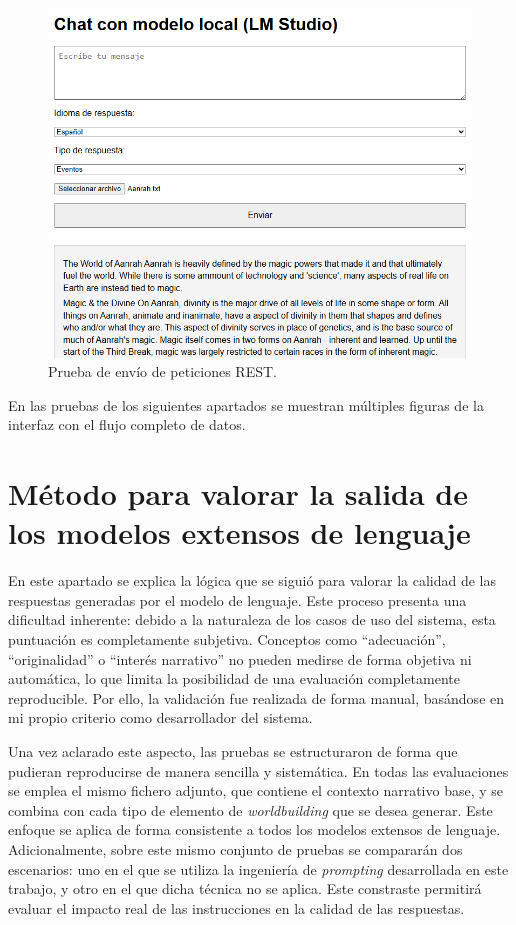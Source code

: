 \begin{figure}[htbp]
	\centering
	\includegraphics[width=1\textwidth]{./Figures/web-test.png}
	\caption{Prueba de envío de peticiones REST.}
	\label{fig:web-test}
\end{figure}

En las pruebas de los siguientes apartados se muestran múltiples figuras de la interfaz con el flujo completo de datos.

\section{Método para valorar la salida de los modelos extensos de lenguaje}
En este apartado se explica la lógica que se siguió para valorar la calidad de las respuestas
generadas por el modelo de lenguaje.
Este proceso presenta una dificultad inherente:
debido a la naturaleza de los casos de uso del sistema, esta puntuación es completamente subjetiva.
Conceptos como “adecuación”, “originalidad” o “interés narrativo” no pueden medirse de forma objetiva ni automática,
lo que limita la posibilidad de una evaluación completamente reproducible.
Por ello, la validación fue realizada de forma manual, basándose en mi propio criterio como desarrollador del sistema.

Una vez aclarado este aspecto, las pruebas se estructuraron de forma que pudieran reproducirse de manera sencilla y sistemática.
En todas las evaluaciones se emplea el mismo fichero adjunto, que contiene el contexto narrativo base,
y se combina con cada tipo de elemento de \textit{worldbuilding} que se desea generar.
Este enfoque se aplica de forma consistente a todos los modelos extensos de lenguaje.
Adicionalmente, sobre este mismo conjunto de pruebas se compararán dos escenarios:
uno en el que se utiliza la ingeniería de \textit{prompting} desarrollada en este trabajo,
y otro en el que dicha técnica no se aplica.
Este constraste permitirá evaluar el impacto real de las instrucciones en la calidad de las respuestas.

